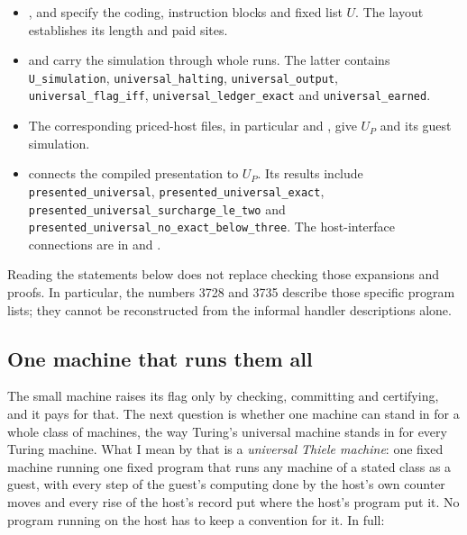 \documentclass[11pt,twoside]{article}
\theoremstyle{thielethm}
\theoremstyle{thieledef}
\theoremstyle{thieledef}
\theoremstyle{thieledef}
\theoremstyle{thielethm}
\theoremstyle{thieleobs}
\theoremstyle{thielethm}
\begin{document}
\begingroup\raggedright
\begin{itemize}

\item {},
 and
 specify the coding, instruction blocks
and fixed list $U$. The layout establishes its length and paid sites.

\item {} and
 carry the simulation through whole runs.
The latter contains \texttt{U\_simulation}, \texttt{universal\_halting},
\texttt{universal\_output}, \texttt{universal\_flag\_iff},
\texttt{universal\_ledger\_exact} and \texttt{universal\_earned}.

\item The corresponding priced-host files, in particular
 and
, give $U_P$ and its guest simulation.

\item {} connects the compiled
presentation to $U_P$. Its results include \texttt{presented\_universal},
\texttt{presented\_universal\_exact},
\texttt{presented\_universal\_surcharge\_le\_two} and
\texttt{presented\_universal\_no\_exact\_below\_three}.
The host-interface connections are in
 and
.

\end{itemize}
\endgroup

Reading the statements below does not replace checking those expansions and proofs.
In particular, the numbers 3728 and 3735 describe those specific program lists;
they cannot be reconstructed from the informal handler descriptions alone.

\subsection{One machine that runs them all}
\label{sec:universal-host}

The small machine raises its flag only by checking, committing and certifying, and it pays
for that. The next question is whether one machine can stand in for a whole class of machines, the way
Turing's universal machine stands in for every Turing machine. What I mean by that is a
\emph{universal Thiele machine}: one fixed machine running one fixed program that runs any
machine of a stated class as a guest, with every step of the guest's computing done by the host's
own counter moves and every rise of the host's record put where the host's program put it. No
program running on the host has to keep a convention for it. In full:
\end{document}
